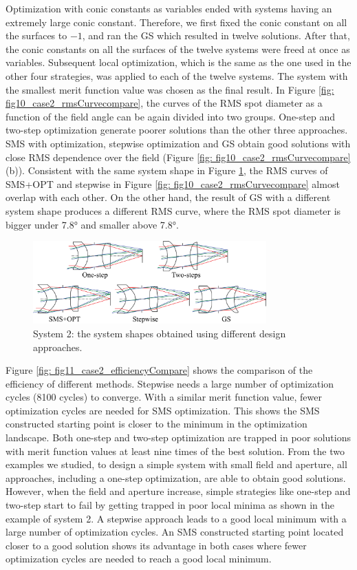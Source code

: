 Optimization with conic constants as variables ended with systems having an extremely large conic constant. Therefore, we first fixed the conic constant on all the surfaces to $-1$, and ran the GS which resulted in twelve solutions. After that, the conic constants on all the surfaces of the twelve systems were freed at once as variables. Subsequent local optimization, which is the same as the one used in the other four strategies, was applied to each of the twelve systems. The system with the smallest merit function value was chosen as the final result. In Figure \ref{fig: fig10_case2_rmsCurvecompare}, the curves of the RMS spot diameter as a function of the field angle can be again divided into two groups. One-step and two-step optimization generate poorer solutions than the other three approaches. SMS with optimization, stepwise optimization and GS obtain good solutions with close RMS dependence over the field (Figure \ref{fig: fig10_case2_rmsCurvecompare}(b)). Consistent with the same system shape in Figure \ref{fig: fig9_case2_systems}, the RMS curves of SMS+OPT and stepwise in Figure \ref{fig: fig10_case2_rmsCurvecompare} almost overlap with each other. On the other hand, the result of GS with a different system shape produces a different RMS curve, where the RMS spot diameter is bigger under 7.8° and smaller above 7.8°.

\begin{figure}[h!]
    \centering
    \includegraphics[width=0.8\textwidth]{chapter-5/figures/Figure9_system2_solutions.png}
    \caption{System 2: the system shapes obtained using different design approaches.}
    \label{fig: fig9_case2_systems}
\end{figure}

Figure \ref{fig: fig11_case2_efficiencyCompare} shows the comparison of the efficiency of different methods. Stepwise needs a large number of optimization cycles (8100 cycles) to converge. With a similar merit function value, fewer optimization cycles are needed for SMS optimization. This shows the SMS constructed starting point is closer to the minimum in the optimization landscape. Both one-step and two-step optimization are trapped in poor solutions with merit function values at least nine times of the best solution. 
From the two examples we studied, to design a simple system with small field and aperture, all approaches, including a one-step optimization, are able to obtain good solutions. However, when the field and aperture increase, simple strategies like one-step and two-step start to fail by getting trapped in poor local minima as shown in the example of system 2. A stepwise approach leads to a good local minimum with a large number of optimization cycles. An SMS constructed starting point located closer to a good solution shows its advantage in both cases where fewer optimization cycles are needed to reach a good local minimum.

